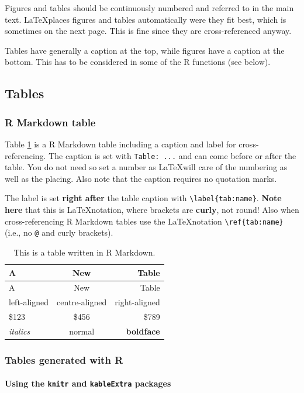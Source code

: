 \documentclass[a4paper,12pt]{article}
\begin{document}
Figures and tables should be continuously numbered and referred to in the main text. \LaTeX places figures and tables automatically were they fit best, which is sometimes on the next page. This is fine since they are cross-referenced anyway.

Tables have generally a caption at the top, while figures have a caption at the bottom. This has to be considered in some of the R functions (see below).

\hypertarget{tables}{%
\subsection{Tables}\label{tables}}

\hypertarget{r-markdown-table}{%
\subsubsection{R Markdown table}\label{r-markdown-table}}

Table \ref{tab:rmd_tab} is a R Markdown table including a caption and label for cross-referencing. The caption is set with \texttt{Table:\ ...} and can come before or after the table. You do not need so set a number as \LaTeX will care of the numbering as well as the placing. Also note that the caption requires no quotation marks.

The label is set \textbf{right after} the table caption with \texttt{\textbackslash{}label\{tab:name\}}. \textbf{Note here} that this is \LaTeX notation, where brackets are \textbf{curly}, not round! Also when cross-referencing R Markdown tables use the \LaTeX notation \texttt{\textbackslash{}ref\{tab:name\}} (i.e., no \texttt{@} and curly brackets).
\begin{longtable}[]{@{}lcr@{}}
\caption{This is a table written in R Markdown.\label{tab:rmd_tab}}\tabularnewline
\toprule
A & New & Table\tabularnewline
\midrule
\endfirsthead
\toprule
A & New & Table\tabularnewline
\midrule
\endhead
left-aligned & centre-aligned & right-aligned\tabularnewline
\$123 & \$456 & \$789\tabularnewline
\emph{italics} & normal & \textbf{boldface}\tabularnewline
\bottomrule
\end{longtable}
\hypertarget{tables-generated-with-r}{%
\subsubsection{Tables generated with R}\label{tables-generated-with-r}}

\hypertarget{using-the-knitr-and-kableextra-packages}{%
\paragraph{\texorpdfstring{Using the \texttt{knitr} and \texttt{kableExtra} packages}{Using the knitr and kableExtra packages}}\label{using-the-knitr-and-kableextra-packages}}
\end{document}
